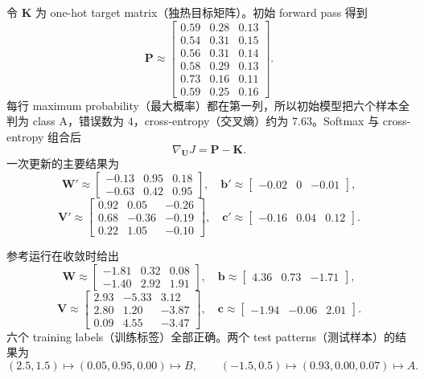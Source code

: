\begin{checkedsolution}
令 $\bm K$ 为 one-hot target matrix（独热目标矩阵）。初始 forward pass 得到
\[
  \bm P\approx
  \begin{bmatrix}
    0.59&0.28&0.13\\0.54&0.31&0.15\\0.56&0.31&0.14\\
    0.58&0.29&0.13\\0.73&0.16&0.11\\0.59&0.25&0.16
  \end{bmatrix}.
\]
每行 maximum probability（最大概率）都在第一列，所以初始模型把六个样本全判为 class A，错误数为 $4$，cross-entropy（交叉熵）约为 $7.63$。Softmax 与 cross-entropy 组合后
\[
  \boxed{\nabla_{\bm U}J=\bm P-\bm K}.
\]
一次更新的主要结果为
\[
  \bm W'\approx\begin{bmatrix}-0.13&0.95&0.18\\-0.63&0.42&0.95\end{bmatrix},\quad
  \bm b'\approx\begin{bmatrix}-0.02&0&-0.01\end{bmatrix},
\]
\[
  \bm V'\approx\begin{bmatrix}0.92&0.05&-0.26\\0.68&-0.36&-0.19\\0.22&1.05&-0.10\end{bmatrix},\quad
  \bm c'\approx\begin{bmatrix}-0.16&0.04&0.12\end{bmatrix}.
\]

参考运行在收敛时给出
\[
  \bm W\approx\begin{bmatrix}-1.81&0.32&0.08\\-1.40&2.92&1.91\end{bmatrix},\quad
  \bm b\approx\begin{bmatrix}4.36&0.73&-1.71\end{bmatrix},
\]
\[
  \bm V\approx\begin{bmatrix}
    2.93&-5.33&3.12\\2.80&1.20&-3.87\\0.09&4.55&-3.47
  \end{bmatrix},\quad
  \bm c\approx\begin{bmatrix}-1.94&-0.06&2.01\end{bmatrix}.
\]
六个 training labels（训练标签）全部正确。两个 test patterns（测试样本）的结果为
\[
  (2.5,1.5)\mapsto(0.05,0.95,0.00)\mapsto B,\qquad
  (-1.5,0.5)\mapsto(0.93,0.00,0.07)\mapsto A.
\]


\end{checkedsolution}
